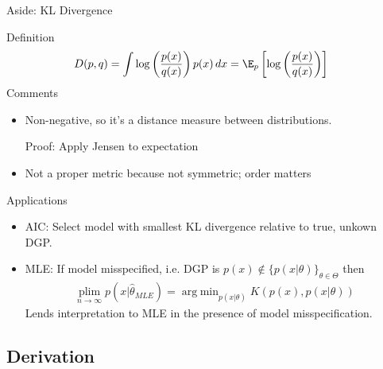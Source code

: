 \documentclass[aspectratio=169, handout]{beamer}
\newcommand{\ra}{\rightarrow}
\DeclareMathOperator*{\argmin}{arg\;min}
\begin{document}
{\footnotesize
\begin{frame}{Aside: KL Divergence}

Definition
\begin{align*}
  D(p,q)
  &=
  \int
  \log\left(
  \frac{p(x)}{q(x)}
  \right)
  p(x)
  \,dx
  =
  \E_p\left[
    \log\left(
    \frac{p(x)}{q(x)}
    \right)
  \right]
\end{align*}
Comments
\begin{itemize}
  \item Non-negative, so it's a \alert{distance} measure between
    \alert{distributions}.

    Proof: Apply Jensen to expectation

  \item Not a proper metric because not symmetric; order matters
\end{itemize}
Applications
\begin{itemize}
  \item AIC:
    Select model with smallest KL divergence relative to true, unkown
    DGP.
  \item MLE:
    If model \alert{misspecified}, i.e. DGP is
    $p(x)\not\in\{p(x|\theta)\}_{\theta\in\Theta}$ then
    \begin{align*}
      \underset{n\ra\infty}{\text{plim}}
      \;
      p(x|\hat{\theta}_{MLE})
      =
      \argmin_{p(x|\theta)}
      K(p(x),p(x|\theta))
    \end{align*}
    Lends interpretation to MLE in the presence of model
    misspecification.
\end{itemize}
\end{frame}
}



\subsection{Derivation}
\end{document}
